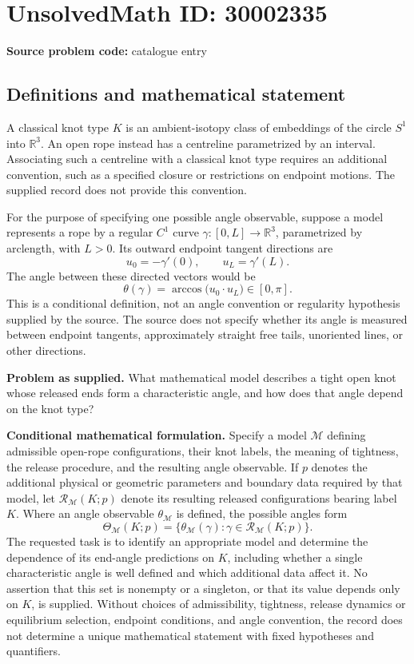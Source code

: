 \documentclass[11pt]{article}
\newcommand{\R}{\mathbb{R}}
\begin{document}
\section*{UnsolvedMath ID: 30002335}
\textbf{Source problem code:} catalogue entry
\subsection{Definitions and mathematical statement}
A classical knot type \(K\) is an ambient-isotopy class of embeddings of the circle \(S^1\) into \(\R^3\). An open rope instead has a centreline parametrized by an interval. Associating such a centreline with a classical knot type requires an additional convention, such as a specified closure or restrictions on endpoint motions. The supplied record does not provide this convention.

For the purpose of specifying one possible angle observable, suppose a model represents a rope by a regular \(C^1\) curve \(\gamma:[0,L]\to\R^3\), parametrized by arclength, with \(L>0\). Its outward endpoint tangent directions are
\[
 u_0=-\gamma'(0),\qquad u_L=\gamma'(L).
\]
The angle between these directed vectors would be
\[
 \theta(\gamma)=\arccos\bigl(u_0\cdot u_L\bigr)\in[0,\pi].
\]
This is a conditional definition, not an angle convention or regularity hypothesis supplied by the source. The source does not specify whether its angle is measured between endpoint tangents, approximately straight free tails, unoriented lines, or other directions.

\textbf{Problem as supplied.} What mathematical model describes a tight open knot whose released ends form a characteristic angle, and how does that angle depend on the knot type?

\textbf{Conditional mathematical formulation.} Specify a model \(\mathcal M\) defining admissible open-rope configurations, their knot labels, the meaning of tightness, the release procedure, and the resulting angle observable. If \(p\) denotes the additional physical or geometric parameters and boundary data required by that model, let \(\mathcal R_{\mathcal M}(K;p)\) denote its resulting released configurations bearing label \(K\). Where an angle observable \(\theta_{\mathcal M}\) is defined, the possible angles form
\[
 \Theta_{\mathcal M}(K;p)
 =\{\theta_{\mathcal M}(\gamma):\gamma\in\mathcal R_{\mathcal M}(K;p)\}.
\]
The requested task is to identify an appropriate model and determine the dependence of its end-angle predictions on \(K\), including whether a single characteristic angle is well defined and which additional data affect it. No assertion that this set is nonempty or a singleton, or that its value depends only on \(K\), is supplied. Without choices of admissibility, tightness, release dynamics or equilibrium selection, endpoint conditions, and angle convention, the record does not determine a unique mathematical statement with fixed hypotheses and quantifiers.
\end{document}
